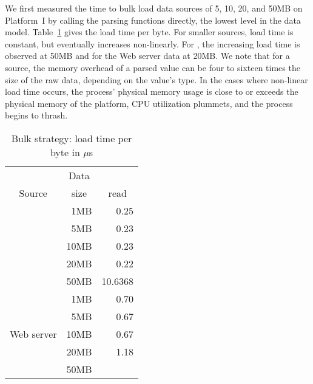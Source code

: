 We first measured the time to bulk load data sources of 5, 10, 20, and
50MB on Platform~I by calling the \pads{} parsing functions directly,
\ie{} the lowest level in the \padx{} data model.
Table~\ref{tab:bulk} gives the load time per byte.  For smaller
sources, load time is constant, but eventually increases non-linearly.
For \dibbler{}, the increasing load time is observed at 50MB and for
the Web server data at 20MB.  We note that for a \pads{} source, the
memory overhead of a \pads{} parsed value can be four to sixteen times
the size of the raw data, depending on the value's type.  In the cases
where non-linear load time occurs, the process' physical memory usage
is close to or exceeds the physical memory of the platform, CPU
utilization plummets, and the process begins to thrash.
\begin{table}
\begin{center}
\begin{tabular}{c|r|r}
           & \multicolumn{1}{c|}{Data}  & \multicolumn{1}{c}{\pads{}} \\
Source     & \multicolumn{1}{c|}{size}  & \multicolumn{1}{c}{read} \\ \hline

           &  1MB  & 0.25\\
           &  5MB  & 0.23\\
\dibbler{} & 10MB  & 0.23\\
           & 20MB  & 0.22\\
           & 50MB  & 10.6368  \\ \hline 
           &  1MB  & 0.70\\
           &  5MB  & 0.67\\
Web server & 10MB  & 0.67\\
           & 20MB  & 1.18\\ %
           & 50MB  &     \\ 

\end{tabular}
\end{center}
\caption{Bulk strategy: load time per byte in $\mu$s}
\label{tab:bulk}
\end{table}


